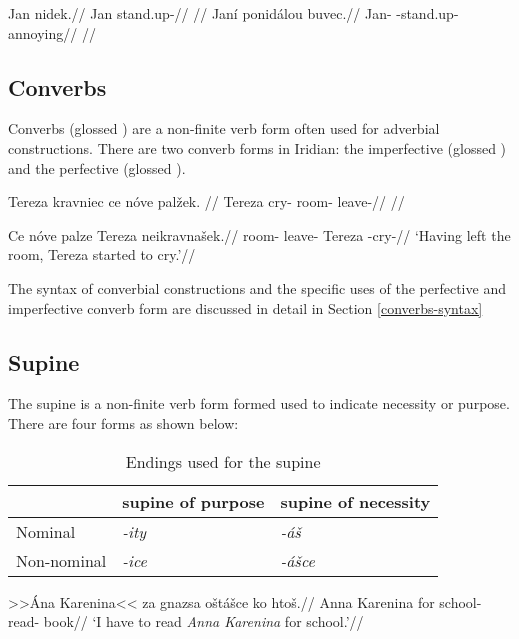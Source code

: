 \pex
\a
\begingl
\gla Jan nidek.//
\glb Jan stand.up-//
\glft {}//
\endgl
\a
\begingl
\gla Jan\'i ponid\'alou buvec.//
\glb Jan- -stand.up- annoying//
\glft {}//
\endgl
\xe

\subsection{Converbs}
Converbs (glossed ) are a non-finite verb form often used for adverbial constructions. There are two converb forms in Iridian: the imperfective  (glossed ) and the perfective  (glossed ).

\pex
\begingl
\gla Tereza kravniec ce nóve pal\v{z}ek. //
\glb Tereza cry-  room- leave-//
\glft {}//
\endgl
\xe

\pex
\begingl
\gla Ce nóve palze Tereza neikravna\v{s}ek.//
\glb {} room- leave- Tereza -cry-//
\glft `Having left the room, Tereza started to cry.'//
\endgl
\xe

The syntax of converbial constructions and the specific uses of the perfective and imperfective converb form are discussed in detail in Section \ref{converbs-syntax}


\subsection{Supine}
The supine is a non-finite verb form formed used to indicate necessity or purpose. There are four forms as shown below:

\begin{table}[h!]
	\centering\small
	\caption{Endings used for the supine}
	\begin{tabularx}{0.8\textwidth}{MMM}
		\toprule
		&{\sc supine of purpose}&{\sc supine of necessity}\\
		\midrule
		Nominal & \textit{-ity} & \textit{-á\v{s}}\\
		\addlinespace
		Non-nominal & \textit{-ice} & \textit{-á\v{s}ce}\\
		\bottomrule
	\end{tabularx}
\end{table}


	\pex
\begingl
\gla >>Ána Karenina<< za gnazsa o\v{s}tá\v{s}ce ko hto\v{s}.//
\glb Anna Karenina for school- read-  book//
\glft `I have to read \textit{Anna Karenina} for school.'//
\endgl
\xe

